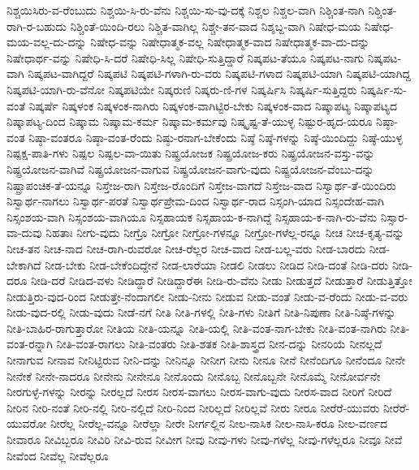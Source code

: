 {ನಿಶ್ಚಯಿಸಿರು-ವ-ರೆಂಬುದು
ನಿಶ್ಚಯಿ-ಸಿ-ರು-ವೆನು
ನಿಶ್ಚಯಿ-ಸು-ವು-ದಕ್ಕೆ
ನಿಶ್ಚಲ
ನಿಶ್ಚಲ-ವಾಗಿ
ನಿಶ್ಚಿಂತ-ನಾಗಿ
ನಿಶ್ಚಿಂತ-ರಾಗಿ-ರ-ಬಹುದು
ನಿಶ್ಚಿಂತೆ-ಯಿಂದಿ-ರಲು
ನಿಶ್ಚಿತ-ವಾಗಿಲ್ಲ
ನಿಶ್ಚೇ-ತನ-ವಾದ
ನಿಶ್ಶಬ್ದ-ವಾಗಿ
ನಿಷೇಧ-ಮಯ
ನಿಷೇಧ-ಮಯ-ವಲ್ಲ-ದು-ದನ್ನು
ನಿಷೇಧ-ವನ್ನು
ನಿಷೇಧಾತ್ಮಕ-ವಲ್ಲ
ನಿಷೇಧಾತ್ಮಕ-ವಾದ
ನಿಷೇಧಾತ್ಮಕ-ವಾ-ದು-ದನ್ನು
ನಿಷೇಧಾರ್ಥ-ವನ್ನು
ನಿಷೇಧಿ-ಸಿ-ದರೆ
ನಿಷೇಧಿ-ಸಿಲ್ಲ
ನಿಷೇಧಿ-ಸುತ್ತಿದ್ದಾರೆ
ನಿಷ್ಕಪಟ-ತೆಯೂ
ನಿಷ್ಕಪಟ-ನಾಗು
ನಿಷ್ಕಪಟ-ವಾಗಿ
ನಿಷ್ಕಪಟ-ವಾಗಿದ್ದರೆ
ನಿಷ್ಕಪಟಿ
ನಿಷ್ಕಪಟಿ-ಗಳಾಗಿ-ರು-ವರು
ನಿಷ್ಕಪಟಿ-ಗಳಾದ
ನಿಷ್ಕಪಟಿ-ಯಾಗಿ
ನಿಷ್ಕಪಟಿ-ಯಾಗಿದ್ದ
ನಿಷ್ಕಪಟಿ-ಯಾಗಿ-ರು-ವೆನೋ
ನಿಷ್ಕಪಟಿಯೇ
ನಿಷ್ಕರುಣಿ
ನಿಷ್ಕರು-ಣಿ-ಗಳ
ನಿಷ್ಕರ್ಷಿಸಿ
ನಿಷ್ಕರ್ಷಿ-ಸುತ್ತಿದ್ದರು
ನಿಷ್ಕರ್ಷಿ-ಸು-ವಂತೆ
ನಿಷ್ಕರ್ಷೆ
ನಿಷ್ಕಳಂಕ
ನಿಷ್ಕಳಂಕ-ನಾಗಿರು
ನಿಷ್ಕಳಂಕ-ವಾಗಿಟ್ಟಿರ-ಬೇಕು
ನಿಷ್ಕಳಂಕ-ವಾದ
ನಿಷ್ಕಾಪಟ್ಯ
ನಿಷ್ಕಾಪಟ್ಯದ
ನಿಷ್ಕಾಪಟ್ಯ-ದಿಂದ
ನಿಷ್ಕಾಮ
ನಿಷ್ಕಾಮ-ಕರ್ಮ
ನಿಷ್ಕಾಮ-ಕರ್ಮವು
ನಿಷ್ಕೃಷ್ಟ-ತೆ-ಯುಳ್ಳ
ನಿಷ್ಟುರ-ಹೃದ-ಯರೂ
ನಿಷ್ಠಾ-ವಂತ
ನಿಷ್ಠಾ-ವಂತರೂ
ನಿಷ್ಠಾ-ವಂತ-ರೆಂದು
ನಿಷ್ಠು-ರನಾಗ-ಬೇಕೆಂದು
ನಿಷ್ಠೆ
ನಿಷ್ಠೆ-ಗಳನ್ನು
ನಿಷ್ಠೆ-ಯಿಂದಿದ್ದು
ನಿಷ್ಠೆ-ಯುಳ್ಳ
ನಿಷ್ಪಕ್ಷ-ಪಾತಿ-ಗಳು
ನಿಷ್ಪಲ
ನಿಷ್ಪಲ-ವಾ-ಯಿತು
ನಿಷ್ಪ್ರಯೋಜಕ
ನಿಷ್ಪ್ರಯೋಜ-ಕರು
ನಿಷ್ಪ್ರಯೋಜನ-ವಸ್ತು-ವನ್ನು
ನಿಷ್ಪ್ರಯೋಜನ-ವಾಗಿವೆ
ನಿಷ್ಪ್ರಯೋಜನ-ವಾಗುವ
ನಿಷ್ಪ್ರಯೋಜನ-ವಾಗು-ವುದು
ನಿಷ್ಪ್ರಯೋಜನ-ವೆಂಬು-ದನ್ನು
ನಿಷ್ಪ್ರಾಪಂಚಿಕ-ತೆ-ಯನ್ನೂ
ನಿಸ್ತೇಜ-ರಾಗಿ
ನಿಸ್ತೇಜ-ರೊಂದಿಗೆ
ನಿಸ್ತೇಜ-ವಾಗದೆ
ನಿಸ್ತೇಜ-ವಾದ
ನಿಸ್ವಾರ್ಥ-ತೆ-ಯಿಂದಿರು
ನಿಸ್ವಾರ್ಥ-ನಾಗಲು
ನಿಸ್ವಾರ್ಥ-ಪರತೆ
ನಿಸ್ವಾರ್ಥಪ್ರೇಮ-ದಿಂದ
ನಿಸ್ವಾರ್ಥ-ರಾದ
ನಿಸ್ಸಂಗಿ-ಯಾದ
ನಿಸ್ಸಂದೇಹ-ವಾಗಿ
ನಿಸ್ಸಂಶಯ-ವಾಗಿ
ನಿಸ್ಸಂಶಯ-ವಾಗಿಯೂ
ನಿಸ್ಸಹಾಯಕ
ನಿಸ್ಸಹಾಯ-ಕ-ನಾಗಿದ್ದೆ
ನಿಸ್ಸಹಾಯ-ಕ-ನಾಗಿ-ರು-ವೆನು
ನಿಸ್ಸಾರ-ವಾ-ದುವು
ನಿಹತಾಃ
ನೀಗು-ವುದು
ನೀಗ್ರೊ
ನೀಗ್ರೋ
ನೀಗ್ರೋ-ಗಳನ್ನೂ
ನೀಗ್ರೋ-ಗಳೆಲ್ಲ-ರನ್ನೂ
ನೀಚ
ನೀಚ-ಕೃತ್ಯ-ವನ್ನು
ನೀಚ-ತನ
ನೀಚ-ನಾದ
ನೀಚ-ರಾಗಿ-ರುವರೋ
ನೀಚ-ರೆಲ್ಲರ
ನೀಚ-ವಾದ
ನೀಡ-ಬಲ್ಲ-ವರು
ನೀಡ-ಬಾರದು
ನೀಡ-ಬೇಕಾಗಿದೆ
ನೀಡ-ಬೇಕು
ನೀಡ-ಬೇಕೆಂದಿದ್ದೇನೆ
ನೀಡ-ಲಾರೆಯಾ
ನೀಡಲಿ
ನೀಡಲು
ನೀಡಿದ
ನೀಡಿ-ದಂತೆ
ನೀಡಿ-ದರು
ನೀಡಿ-ದರೂ
ನೀಡಿ-ದರೆ
ನೀಡಿದ-ವಳು
ನೀಡಿದ್ದಾರೆ
ನೀಡಿದ್ದಾರೆಈ
ನೀಡಿ-ರು-ವೆನು
ನೀಡು
ನೀಡುತ್ತದೆ
ನೀಡುತ್ತಾರೆ
ನೀಡುತ್ತಿತ್ತೋ
ನೀಡುತ್ತಿರು-ವುದ-ರಿಂದ
ನೀಡುತ್ತೇ-ನೆಂದಾಗಲೀ
ನೀಡು-ನೀನು
ನೀಡುವ
ನೀಡು-ವಂತೆ
ನೀಡು-ವ-ರೆಂದು
ನೀಡು-ವ-ವರು
ನೀಡು-ವುದ-ರಲ್ಲಿ
ನೀಡು-ವುದು
ನೀಡೆ-ನಗೆ
ನೀತಿ
ನೀತಿ-ಗಳಲ್ಲಿ
ನೀತಿ-ಗಳು
ನೀತಿಗೆ
ನೀತಿ-ನಿಪುಣಾ
ನೀತಿ-ನಿಷ್ಠೆ-ಗಳನ್ನು
ನೀತಿ-ಬಾಹಿರ-ರಾಗುತ್ತಾರೋ
ನೀತಿಯ
ನೀತಿ-ಯನ್ನೂ
ನೀತಿ-ಯಲ್ಲಿ
ನೀತಿ-ವಂತ-ನಾಗ-ಬೇಕು
ನೀತಿ-ವಂತ-ನಾಗಿರು
ನೀತಿ-ವಂತ-ರನ್ನಾಗಿ
ನೀತಿ-ವಂತ-ರಾಗಲು
ನೀತಿ-ವಂತರು
ನೀತಿ-ಶತಕ
ನೀತಿ-ಶಾಸ್ತ್ರದ
ನೀನ-ದನ್ನು
ನೀನರಿಯೆ
ನೀನಲ್ಲದೆ
ನೀನಾಗುವ
ನೀನಾವ
ನೀನಿಟ್ಟಿರುವ
ನೀನಿ-ದನ್ನು
ನೀನಿನ್ನೂ
ನೀನೀಗ
ನೀನು
ನೀನೂ
ನೀನೆ
ನೀನೆಂದಿಗೂ
ನೀನೆಂದೂ
ನೀನೇ
ನೀನೇಕೆ
ನೀನೇ-ನಾದರೂ
ನೀನೇನು
ನೀನೇನೂ
ನೀನೊಂದು
ನೀನೊಬ್ಬ
ನೀನೊಬ್ಬನೇ
ನೀನೊಮ್ಮೆ
ನೀನೋರ್ವನೇ
ನೀರಗುಳ್ಳೆ-ಗಳನ್ನು
ನೀರನ್ನು
ನೀರಲ್ಲದೆ
ನೀರಸ
ನೀರಸ-ವಾಗಲು
ನೀರಸ-ವಾಗು-ವುದು
ನೀರಸ-ವಾದ
ನೀರಿಗೆ
ನೀರಿದೆ
ನೀರಿನ
ನೀರಿ-ನಂತೆ
ನೀರಿ-ನಲ್ಲಿ
ನೀರಿ-ನಲ್ಲಿದೆ
ನೀರಿ-ನಿಂದ
ನೀರಿಲ್ಲದೆ
ನೀರಿಲ್ಲವೆ
ನೀರು
ನೀರೂ
ನೀರೆರೆ-ಯುವರು
ನೀರೆರೆ-ಯುವರೋ
ನೀರೆಲ್ಲ
ನೀರೆಲ್ಲ-ವನ್ನೂ
ನೀರೆಲ್ಲಾ
ನೀರೇ
ನೀರ್ಗಲ್ಲಿನ
ನೀಲ-ನಾಸಿಕ
ನೀಲ-ನಾಸಿ-ಕರೂ
ನೀಲ-ವರ್ಣದ
ನೀವಾರೂ
ನೀವಿಬ್ಬರೂ
ನೀವಿರಿ
ನೀವಿ-ರುವ
ನೀವೀಗ
ನೀವು
ನೀವು-ಗಳು
ನೀವು-ಗಳೆಲ್ಲ
ನೀವು-ಗಳೆಲ್ಲರೂ
ನೀವೂ
ನೀವೆ
ನೀವೆಂದ
ನೀವೆಲ್ಲ
ನೀವೆಲ್ಲರೂ
}

